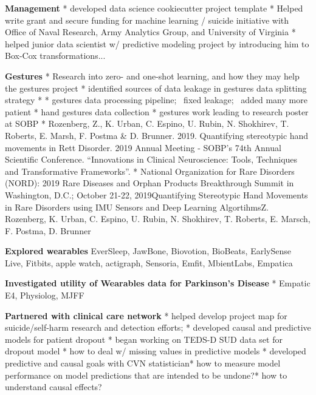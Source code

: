 \begin{itemize*}
  \item\leftandright
    {\textbf{Management}}
    * developed data science cookiecutter project template
    * Helped write grant and secure funding for machine learning / suicide
    initiative with Office of Naval Research, Army Analytics Group, and
    University of Virginia
    * helped junior data scientist w/ predictive modeling project by
    introducing him to Box-Cox transformations...
  \item\leftandright
    {\textbf{Gestures}}
    * Research into zero- and one-shot learning, and how they may help the
    gestures project
    * identified sources of data leakage in gestures data splitting
    strategy
    * * gestures data processing pipeline;  fixed leakage;  added many
    more patient
    * hand gestures data collection
    * gestures work leading to research poster at SOBP
    * Rozenberg, Z., K. Urban, C. Espino, U. Rubin, N. Shokhirev, T.
      Roberts, E. Marsh, F. Postma & D. Brunner. 2019. Quantifying
      stereotypic hand movements in Rett Disorder. 2019 Annual Meeting -
      SOBP’s 74th Annual Scientific Conference. “Innovations in Clinical
      Neuroscience: Tools, Techniques and Transformative Frameworks”.
    * National Organization for Rare
      Disorders (NORD): 2019 Rare Diseases and Orphan Products
      Breakthrough Summit in Washington, D.C.; October 21-22,
      2019Quantifying Stereotypic Hand Movements in Rare Disorders using
      IMU Sensors and Deep Learning AlgortihmsZ. Rozenberg, K. Urban, C.
      Espino, U. Rubin, N. Shokhirev, T. Roberts, E. Marsch, F. Postma, D.
      Brunner

  \item\leftandright
    {\textbf{Explored wearables}}
    EverSleep, JawBone, Biovotion, BioBeats, EarlySense Live, Fitbits,
    apple watch, actigraph, Sensoria, Emfit, MbientLabs, Empatica
  \item\leftandright
    {\textbf{Investigated utility of Wearables data for Parkinson's
    Disease}}
    * Empatic E4, Physiolog, MJFF
  \item\leftandright
    {\textbf{Partnered with clinical care network}}
    * helped develop project map for suicide/self-harm research and detection
    efforts; * developed causal and predictive models for patient
    dropout
    * began working on TEDS-D SUD data set for dropout model
    * how to deal w/ missing values in predictive models
    * developed predictive and causal goals with CVN statistician* how
    to measure model performance on model predictions that are intended
    to be undone?* how to understand causal effects?


\end{itemize*}
